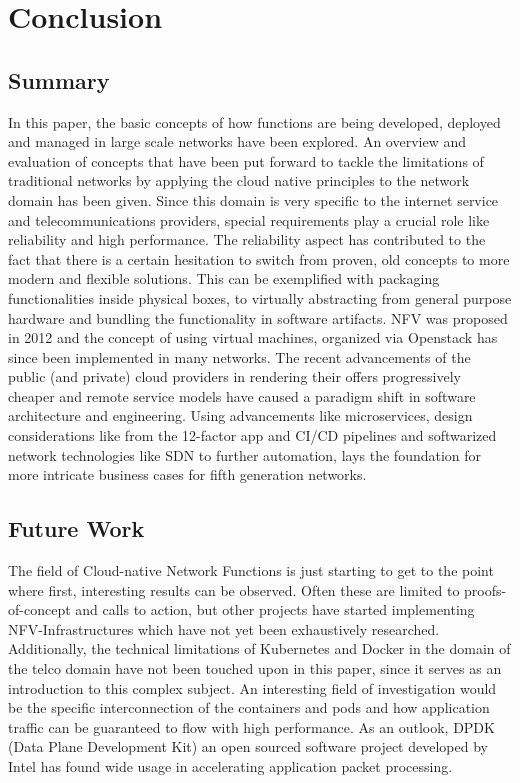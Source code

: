 \section{Conclusion}

\subsection{Summary}
In this paper, the basic concepts of how functions are being developed, deployed and managed in large scale networks have been explored. An overview and evaluation of concepts that have been put forward to tackle the limitations of traditional networks by applying the cloud native principles to the network domain has been given.
Since this domain is very specific to the internet service and telecommunications providers, special requirements play a crucial role like reliability and high performance. The reliability aspect has contributed to the fact that there is a certain hesitation to switch from proven, old concepts to more modern and flexible solutions. This can be exemplified with packaging functionalities inside physical boxes, to virtually abstracting from general purpose hardware and bundling the functionality in software artifacts. NFV was proposed in 2012 and the concept of using virtual machines, organized via Openstack has since been implemented in many networks. The recent advancements of the public (and private) cloud providers in rendering their offers progressively cheaper and remote service models have caused a paradigm shift in software architecture and engineering. Using advancements like microservices, design considerations like from the 12-factor app and CI/CD pipelines and softwarized network technologies like SDN to further automation, lays the foundation for more intricate business cases for fifth generation networks.

\subsection{Future Work}
The field of Cloud-native Network Functions is just starting to get to the point where first, interesting results can be observed. Often these are limited to proofs-of-concept and calls to action, but other projects have started implementing NFV-Infrastructures which have not yet been exhaustively researched. Additionally, the technical limitations of Kubernetes and Docker in the domain of the telco domain have not been touched upon in this paper, since it serves as an introduction to this complex subject. An interesting field of investigation would be the specific interconnection of the containers and pods and how application traffic can be guaranteed to flow with high performance. As an outlook, DPDK (Data Plane Development Kit) an open sourced software project developed by Intel has found wide usage in accelerating application packet processing. 